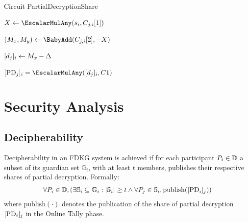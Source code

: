 \documentclass{article}
\begin{document}
\begin{algorithm}[H]
\caption{Circuit PartialDecryptionShare}
\label{alg:circuit_proof_pds}


\BlankLine

$X \leftarrow \EscalarMulAny(\PartySecretKey{i}, \EncryptedPartialDecryptionKeyShare{j}{i}[1])$\; %

$(M_x, M_y) \leftarrow \BabyAdd(\EncryptedPartialDecryptionKeyShare{j}{i}[2], - X)$\; %

$[d_{j}]_{i} \leftarrow M_x - \Delta$\;

\Assert $\SharePartialDecryptionFromTo{j}{i} = \EscalarMulAny(\PartialDecryptionKeyShare{j}{i}, \TotalA{})$
\end{algorithm}


\section{Security Analysis}


\subsection*{Decipherability}

\begin{definition}[Decipherability] \label{def:decipherability}
    Decipherability in an FDKG system is achieved if for each participant $P_{i} \in \mathbb{D}$ a subset of its guardian set $\mathbb{G}_i$, with at least $t$ members, publishes their respective shares of partial decryption. Formally: 
    \[
    \forall P_{i} \in \mathbb{D}, \left( \exists \mathbb{S}_i \subseteq \mathbb{G}_i : |\mathbb{S}_i| \geq t \land \forall P_{j} \in \mathbb{S}_i, \textrm{publish}([\mathrm{PD}_{i}]_{j}) \right)
    \]
    where \(\textrm{publish}(\cdot)\) denotes the publication of the share of partial decryption $[\mathrm{PD}_{i}]_{j}$ in the Online Tally phase.
\end{definition}
\end{document}
